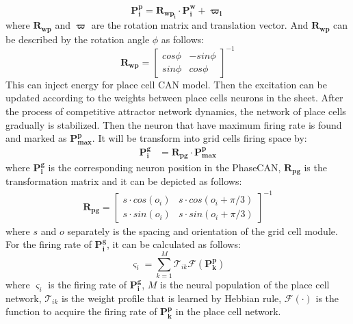 \documentclass[final,5p,times,twocolumn,authoryear]{elsarticle}
\begin{document}
\begin{equation}\label{eq:worldframe2pcframe} 
	\boldsymbol{P^p_i} = \boldsymbol{R_{wp_i}}\cdot \boldsymbol{P^w_i} + \boldsymbol{\varpi_i}
\end{equation}	
where $\boldsymbol{R_{wp}}$ and $\boldsymbol{\varpi}$ are the rotation matrix and translation vector. And $\boldsymbol{R_{wp}}$ can be described by the rotation angle $\phi$ as follows:
\begin{equation}\label{eq:rotation_matrix}
	\boldsymbol{R_{wp}} =
	\begin{bmatrix}
		cos\phi& -sin\phi\\
		sin\phi& cos\phi
	\end{bmatrix}^{-1}
\end{equation}
This can inject energy for place cell CAN model. Then the excitation can be updated according to the weights between place cells neurons in the sheet\citep{McNaughton2006c}. After the process of competitive attractor network dynamics, the network of place cells gradually is stabilized. Then the neuron that have maximum firing rate is found and marked as $\boldsymbol{P^p_\text{max}}$. It will be transform into grid cells firing space by:
\begin{align}\label{eq:cal_position}
	\bm{P^g_i} &= \bm{R_{pg}}\cdot \bm{P^p_\text{max}} 
\end{align}
where $\boldsymbol{P^g_i}$ is the corresponding neuron position in the PhaseCAN, $\boldsymbol{R_{pg}}$ is the transformation matrix and it can be depicted as follows:
\begin{align}
	\boldsymbol{R_{pg}} =
	\begin{bmatrix}
		s\cdot cos(o_i)& s\cdot cos(o_i+\pi/3)\\
		s\cdot sin(o_i)& s\cdot sin(o_i+\pi/3)
	\end{bmatrix}^{-1}
\end{align}
where $s$ and $o$ separately is the spacing and orientation of the grid cell module. For the firing rate of $\bm{P^g_i}$, it can be calculated as follows:
\begin{equation}\label{eq:cal_rate}
	\varsigma_i = \sum_{k=1}^{M} \mathcal{T}_{ik} \mathcal{F}(\bm{P^p_k})
\end{equation}
where $\varsigma_i$ is the firing rate of $\bm{P^g_i}$, $M$ is the neural population of the place cell network, $\mathcal{T}_{ik}$ is the weight profile that is learned by Hebbian rule, $\mathcal{F}(\cdot)$ is the function to acquire the firing rate of $\bm{P^p_k}$ in the place cell network.
\end{document}
